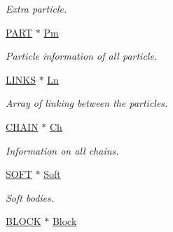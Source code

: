 \begin{DoxyCompactItemize}
\begin{DoxyCompactList}\small\item\em \-Extra particle. \end{DoxyCompactList}\item 
\hypertarget{classVarData_a53eee20378b4a2c61407897d98a4b5d7}{\hyperlink{structPART}{\-P\-A\-R\-T} $\ast$ \hyperlink{classVarData_a53eee20378b4a2c61407897d98a4b5d7}{\-Pm}}\label{classVarData_a53eee20378b4a2c61407897d98a4b5d7}

\begin{DoxyCompactList}\small\item\em \-Particle information of all particle. \end{DoxyCompactList}\item 
\hypertarget{classVarData_a8864e546987744c3b932ff2a3b8c1291}{\hyperlink{structLINKS}{\-L\-I\-N\-K\-S} $\ast$ \hyperlink{classVarData_a8864e546987744c3b932ff2a3b8c1291}{\-Ln}}\label{classVarData_a8864e546987744c3b932ff2a3b8c1291}

\begin{DoxyCompactList}\small\item\em \-Array of linking between the particles. \end{DoxyCompactList}\item 
\hypertarget{classVarData_af2deb35998deb81dc9ef4ae6f65cc27d}{\hyperlink{structCHAIN}{\-C\-H\-A\-I\-N} $\ast$ \hyperlink{classVarData_af2deb35998deb81dc9ef4ae6f65cc27d}{\-Ch}}\label{classVarData_af2deb35998deb81dc9ef4ae6f65cc27d}

\begin{DoxyCompactList}\small\item\em \-Information on all chains. \end{DoxyCompactList}\item 
\hypertarget{classVarData_aba4b9513e79903ba8a0f586f1cef52ef}{\hyperlink{structSOFT}{\-S\-O\-F\-T} $\ast$ \hyperlink{classVarData_aba4b9513e79903ba8a0f586f1cef52ef}{\-Soft}}\label{classVarData_aba4b9513e79903ba8a0f586f1cef52ef}

\begin{DoxyCompactList}\small\item\em \-Soft bodies. \end{DoxyCompactList}\item 
\hypertarget{classVarData_ab8ead2169b1b4894b78fd3c264b6009e}{\hyperlink{structBLOCK}{\-B\-L\-O\-C\-K} $\ast$ \hyperlink{classVarData_ab8ead2169b1b4894b78fd3c264b6009e}{\-Block}}\label{classVarData_ab8ead2169b1b4894b78fd3c264b6009e}


\end{DoxyCompactItemize}
